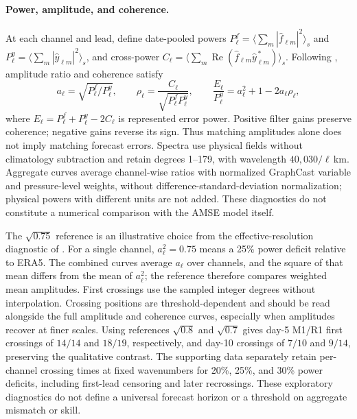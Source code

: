 \documentclass{article}
\newcommand{\vfourchange}[1]{{\color{blue}#1}}
\newcommand{\vfourred}[1]{{\color{blue}#1}}
\begin{document}
\paragraph{\vfourred{Power, amplitude, and coherence.}}
\vfourred{At each channel and lead, define date-pooled powers $P^f_\ell=\langle\sum_m|\widehat f_{\ell m}|^2\rangle_s$ and $P^y_\ell=\langle\sum_m|\widehat y_{\ell m}|^2\rangle_s$, and cross-power $C_\ell=\langle\sum_m\operatorname{Re}(\widehat f_{\ell m}\widehat y_{\ell m}^{\,*})\rangle_s$. Following \citet{subich2025spectral}, amplitude ratio and coherence satisfy}
\vfourred{\begin{equation}
a_\ell=\sqrt{P^f_\ell/P^y_\ell},\qquad
\rho_\ell=\frac{C_\ell}{\sqrt{P^f_\ell P^y_\ell}},\qquad
\frac{E_\ell}{P^y_\ell}=a_\ell^2+1-2a_\ell\rho_\ell,
\label{eq:spectral_diagnostics}
\end{equation}}
\vfourred{where $E_\ell=P^f_\ell+P^y_\ell-2C_\ell$ is represented error power. Positive filter gains preserve coherence; negative gains reverse its sign. Thus matching amplitudes alone does not imply matching forecast errors. Spectra use physical fields without climatology subtraction and retain degrees 1--179, with wavelength $40{,}030/\ell$\,km. Aggregate curves average channel-wise ratios with normalized GraphCast variable and pressure-level weights, without difference-standard-deviation normalization; physical powers with different units are not added. These diagnostics do not constitute a numerical comparison with the AMSE model itself.}

\vfourred{The $\sqrt{0.75}$ reference is an illustrative choice from the effective-resolution diagnostic of \citet[Section~3.1]{subich2025spectral}. For a single channel, $a_\ell^2=0.75$ means a 25\% power deficit relative to ERA5. The combined curves average $a_\ell$ over channels, and the square of that mean differs from the mean of $a_\ell^2$; the reference therefore compares weighted mean amplitudes. First crossings use the sampled integer degrees without interpolation. Crossing positions are threshold-dependent and should be read alongside the full amplitude and coherence curves, especially when amplitudes recover at finer scales. Using references $\sqrt{0.8}$ and $\sqrt{0.7}$ gives day-5 M1/\vfourchange{R1} first crossings of $14/14$ and $18/19$, respectively, and day-10 crossings of $7/10$ and $9/14$, preserving the qualitative contrast. The supporting data separately retain per-channel crossing times at fixed wavenumbers for 20\%, 25\%, and 30\% power deficits, including first-lead censoring and later recrossings. These exploratory diagnostics do not define a universal forecast horizon or a threshold on aggregate mismatch or skill.}
\end{document}
